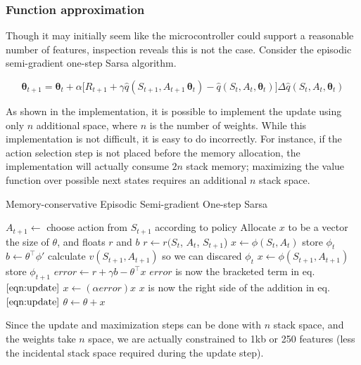 \documentclass{article}
\begin{document}
	\subsubsection{Function approximation}
	
	Though it may initially seem like the microcontroller could support a reasonable number of features, inspection reveals this is not the case. Consider the episodic semi-gradient one-step Sarsa algorithm.
	
	\begin{equation}\label{eqn:update}
	\bm{\theta}_{t+1} = \bm{\theta}_t + \alpha \Big[R_{t+1} + \gamma \hat{q}(S_{t+1}, A_{t+1}\, \bm{\theta}_t) - \hat{q}(S_t, A_t, \bm{\theta}_t)\Big]\Delta\hat{q}(S_t, A_t, \bm{\theta}_t)\tag{1}
	\end{equation}

	As shown in the implementation, it is possible to implement the update using only $n$ additional space, where $n$ is the number of weights. While this implementation is not difficult, it is easy to do incorrectly. For instance, if the action selection step is not placed before the memory allocation, the implementation will actually consume $2n$ stack memory; maximizing the value function over possible next states requires an additional $n$ stack space.
	
		\begin{algorithm}
			\caption{Memory-conservative Episodic Semi-gradient One-step Sarsa}
			\label{alg:update}
			\begin{algorithmic}[1] %
				\State $A_{t+1} \gets $ choose action from $S_{t+1}$ according to policy
				\State Allocate $x$ to be a vector the size of $\theta$, and floats $r$ and $b$
				\State $r\gets r(S_t$, $A_t$, $S_{t+1}$)
				\State $x \gets \phi(S_t, A_t)$ \Comment store $\phi_{t}$
				\State $b \gets \theta^\top \phi'$ \Comment calculate $v(S_{t+1},A_{t+1})$ so we can discared $\phi_{t}$
				\State $x \gets \phi(S_{t+1}, A_{t+1})$ \Comment store $\phi_{t+1}$
				\State $error \gets r + \gamma b - \theta^\top x$ \Comment $error$ is now the bracketed term in eq. $\ref{eqn:update}$
				\State $x \gets (\alpha error)x$ \Comment $x$ is now the right side of the addition in eq. $\ref{eqn:update}$
				\State $\theta \gets \theta + x$
				\
				\EndProcedure
			\end{algorithmic}
		\end{algorithm}
	
	Since the update and maximization steps can be done with $n$ stack space, and the weights take $n$ space, we are actually constrained to 1kb or 250 features (less the incidental stack space required during the update step).
	
\end{document}
